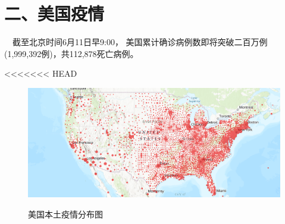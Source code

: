 \documentclass[
]{article}
\begin{document}
\newpage

\hypertarget{section-3}{%
\section{\texorpdfstring{\textcolor{glaucous}{二、美国疫情}}{}}\label{section-3}}

\vspace{-5mm}

\(\quad\)截至北京时间6月11日早9:00，
美国累计确诊病例数即将突破二百万例(1,999,392例)，共112,878死亡病例。

<<<<<<< HEAD
\begin{figure}[H] 
\caption{美国本土疫情分布图} %
\centering
\includegraphics[]{./input/covid4.png} %
\label{} %
\end{figure}
\end{document}
